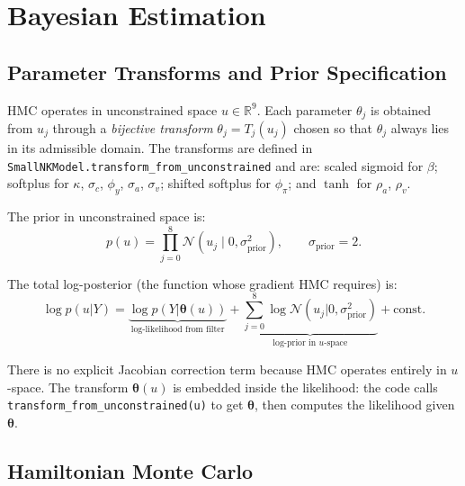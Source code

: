 \documentclass[11pt,a4paper]{article}
\theoremstyle{definition}
\newcommand{\R}{\mathbb{R}}
\newcommand{\btheta}{\boldsymbol{\theta}}
\newcommand{\code}[1]{\texttt{\color{codecolor}#1}}
\begin{document}
	
	\section{Bayesian Estimation}
	\label{sec:estimation}
	
	\subsection{Parameter Transforms and Prior Specification}
	\label{sec:transforms}
	
	HMC operates in unconstrained space $u \in \R^9$.
	Each parameter $\theta_j$ is obtained from $u_j$ through a \emph{bijective transform} $\theta_j = T_j(u_j)$ chosen so that $\theta_j$ always lies in its admissible domain.
	The transforms are defined in \code{SmallNKModel.transform\_from\_unconstrained} and are: scaled sigmoid for $\beta$; softplus for $\kappa$, $\sigma_c$, $\phi_y$, $\sigma_a$, $\sigma_v$; shifted softplus for $\phi_\pi$; and $\tanh$ for $\rho_a$, $\rho_v$.
	
	The prior in unconstrained space is:
	\begin{equation}\label{eq:prior_unconstrained}
		p(u) = \prod_{j=0}^{8} \mathcal{N}(u_j \mid 0, \sigma^2_{\mathrm{prior}}), \qquad \sigma_{\mathrm{prior}} = 2.
	\end{equation}
	
	The total log-posterior (the function whose gradient HMC requires) is:
	\begin{equation}\label{eq:log_posterior}
		\log p(u | Y) = \underbrace{\log p(Y | \btheta(u))}_{\text{log-likelihood from filter}} + \underbrace{\sum_{j=0}^{8} \log \mathcal{N}(u_j | 0, \sigma^2_{\mathrm{prior}})}_{\text{log-prior in } u\text{-space}} + \text{const}.
	\end{equation}
	
	There is no explicit Jacobian correction term because HMC operates entirely in $u$-space.
	The transform $\btheta(u)$ is embedded inside the likelihood: the code calls \code{transform\_from\_unconstrained(u)} to get $\btheta$, then computes the likelihood given $\btheta$.
	
	\subsection{Hamiltonian Monte Carlo}
	\label{sec:hmc}
	
\end{document}
